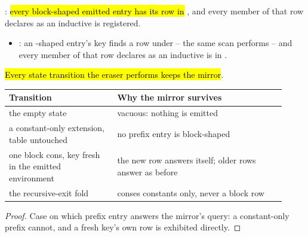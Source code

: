 \begin{definition}
\label{def:Erasure-IndBlocksCover}
\leanok
{}
 : \hl{every block-shaped emitted entry has its row in
}, and every member of that row  declares as an inductive is
registered.
\begin{itemize}
\item {}: an -shaped entry's key finds a row under
 -- the same scan  performs -- and every member of
that row  declares as an inductive is in .
\end{itemize}
\end{definition}

\begin{lemma}
\label{lem:Erasure-indBlocksCover_empty}
\leanok
{}
 \hl{Every state transition the eraser performs keeps the mirror}.
\par\smallskip\noindent
\begin{center}
\begin{tabular}{p{0.36\linewidth}p{0.56\linewidth}}
\toprule
Transition & Why the mirror survives \\
\midrule
the empty state & vacuous: nothing is emitted \\
a constant-only extension, table untouched & no prefix entry is block-shaped \\
one block cons, key fresh in the emitted environment & the new row answers itself; older rows
answer as before \\
the recursive-exit fold & conses constants only, never a block row \\
\bottomrule
\end{tabular}
\end{center}
\end{lemma}
\begin{proof}
\leanok
{}
 Case on which prefix entry answers the mirror's query: a constant-only prefix cannot,
and a fresh key's own row is exhibited directly.
\end{proof}

